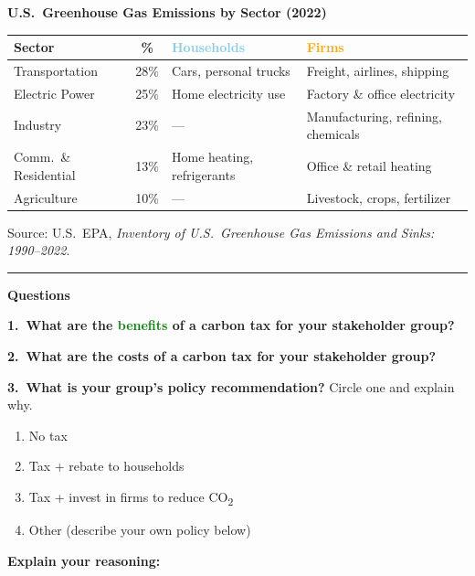 \documentclass[letterpaper,10pt]{article}
\begin{document}
\vspace{0.3em}

\textbf{U.S.\ Greenhouse Gas Emissions by Sector (2022)}

\vspace{0.2em}
\centering
{\small
\begin{tabular}{@{} l c p{3.2cm} p{3.2cm} @{}}
  \toprule
  \textbf{Sector} & \textbf{\%} & \textcolor{skyblue}{\textbf{Households}} & \textcolor{orange}{\textbf{Firms}} \\
  \midrule
  Transportation & 28\% &
    Cars, personal trucks &
    Freight, airlines, shipping \\[0.3em]
  Electric Power & 25\% &
    Home electricity use &
    Factory \& office electricity \\[0.3em]
  Industry & 23\% &
    --- &
    Manufacturing, refining, chemicals \\[0.3em]
  Comm.\ \& Residential & 13\% &
    Home heating, refrigerants &
    Office \& retail heating \\[0.3em]
  Agriculture & 10\% &
    --- &
    Livestock, crops, fertilizer \\
  \bottomrule
\end{tabular}
}

\vspace{0.2em}
{\tiny Source: U.S.\ EPA, \textit{Inventory of U.S.\ Greenhouse Gas Emissions and Sinks: 1990--2022}.}

\raggedright
\vspace{1em}
\hrule
\vspace{0.8em}

{\large\textbf{Questions}}

\vspace{0.8em}

\textbf{1.\ What are the \textcolor{green}{benefits} of a carbon tax for your stakeholder group?}

\vspace{4cm}

\textbf{2.\ What are the \textcolor{vermillion}{costs} of a carbon tax for your stakeholder group?}

\vspace{4cm}

\textbf{3.\ What is your group's \textbf{policy recommendation}?} Circle one and explain why.

\vspace{0.3em}
\begin{enumerate}[label=\alph*)]
  \item No tax
  \item Tax + rebate to households
  \item Tax + invest in firms to reduce CO\textsubscript{2}
  \item Other (describe your own policy below)
\end{enumerate}

\vspace{0.3em}
\textbf{Explain your reasoning:}

\vspace{4cm}
\end{document}
